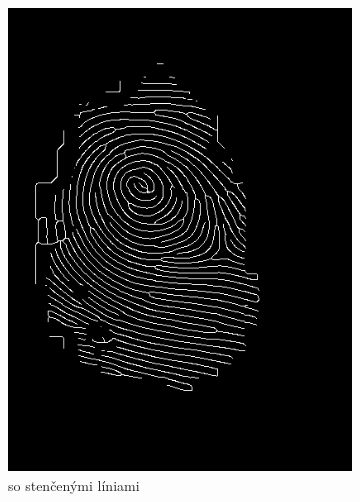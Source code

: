 \begin{figure}[h]
\begin{subfigure}[b]{0.3\linewidth}
      \includegraphics[width=\linewidth]{obrazky-figures/warts_thin.png}
      \caption{so stenčenými líniami}
    \end{subfigure}
    \\
    \begin{subfigure}[b]{0.3\linewidth}

\end{subfigure}
\end{figure}
